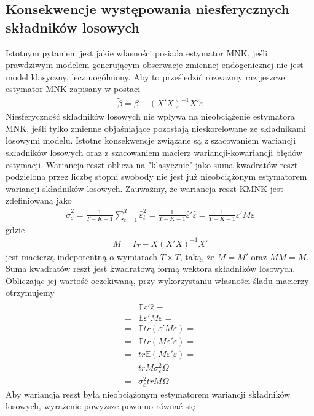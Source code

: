\subsection{Konsekwencje występowania niesferycznych składników losowych}
Istotnym pytaniem jest jakie własności posiada estymator MNK, jeśli prawdziwym modelem generującym obserwacje zmiennej endogenicznej nie jest model klasyczny, lecz uogólniony. Aby to prześledzić rozważmy raz jeszcze estymator MNK zapisany w postaci
\begin{gather*}
\tilde{\beta}=\beta +\left(X'X\right)^{-1}X'\varepsilon
\end{gather*}
Niesferyczność składników losowych nie wpływa na nieobciążenie estymatora MNK, jeśli tylko zmienne objaśniające pozostają nieskorelowane ze składnikami losowymi modelu. Istotne konsekwencje związane są z szacowaniem wariancji składników losowych oraz z szacowaniem macierz wariancji-kowariancji błędów estymacji.
Wariancja reszt oblicza na "klasycznie" jako suma kwadratów reszt podzielona przez liczbę stopni swobody nie jest już nieobciążonym estymatorem wariancji składników losowych. Zauważmy, że wariancja reszt KMNK jest zdefiniowana jako
\begin{gather*}
\tilde{\sigma}^2_\varepsilon=\frac{1}{T-K-1}\sum_{t=1}^{T}\hat{\varepsilon}^2_t=
\frac{1}{T-K-1}\hat{\varepsilon}'\hat{\varepsilon}=
\frac{1}{T-K-1}{\varepsilon}'M{\varepsilon}
\end{gather*}
gdzie
\begin{gather*}
M=I_T-X(X'X)^{-1}X'
\end{gather*}
jest macierzą indepotentną o wymiarach $ T\times T $, taką, że $ M=M' $ oraz $ MM=M $.\\
Suma kwadratów reszt jest kwadratową formą wektora składników losowych. Obliczając jej wartość oczekiwaną, przy wykorzystaniu własności śladu macierzy otrzymujemy
\begin{align*}
&\mathbb E \hat{\varepsilon'}\hat{\varepsilon}
=\\=&
\mathbb E \varepsilon' M\varepsilon
=\\=&
\mathbb E  tr\left(\varepsilon'M\varepsilon\right)
=\\=&
\mathbb E  tr\left(M\varepsilon'\varepsilon\right)
=\\=&
tr\mathbb E  \left(M\varepsilon'\varepsilon\right)
=\\=&
trM\sigma^2_\varepsilon\Omega
=\\=&
\sigma^2_\varepsilon trM\Omega
\end{align*}
Aby wariancja reszt była nieobciążonym estymatorem wariancji składników losowych, wyrażenie powyższe powinno równać się
